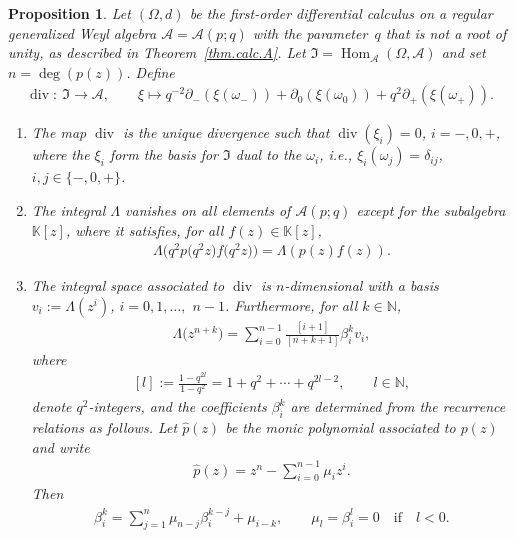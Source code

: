 \documentclass[pdftex]{sigma}
\numberwithin{equation}{section}
\newtheorem{Proposition}[Theorem]{Proposition}
{ \theoremstyle{definition}
\newtheorem{Definition}[Theorem]{Definition}
\newtheorem{Example}[Theorem]{Example}
\newtheorem{Remark}[Theorem]{Remark} }
\def\AWeyl#1#2{{\mathcal{A}}(#1;#2)}
\def\rhom#1#2#3{{\operatorname{Hom}_{#1}(#2,#3)}}
\begin{document}
\begin{Proposition}\label{prop.int}
Let $(\Omega, d)$ be the first-order differential calculus on a regular generalized Weyl algebra ${\mathcal{A}}= \AWeyl p q$ with the parameter~$q$ that is not a root of unity, as described in Theorem~{\rm \ref{thm.calc.A}}. Let ${\mathfrak I} = \rhom {\mathcal{A}} \Omega {\mathcal{A}}$ and set $n = \deg(p(z))$. Define
\begin{gather}\label{div.A}
\operatorname{div} \colon \ {\mathfrak I} \to {\mathcal{A}}, \qquad \xi \mapsto q^{-2}\partial_-(\xi(\omega_-)) + \partial_0(\xi(\omega_0)) + q^{2}\partial_+(\xi(\omega_+)).
\end{gather}
\begin{enumerate}\itemsep=0pt
\item[$(1)$] The map $\operatorname{div}$ is the unique divergence such that $\operatorname{div}(\xi_i)=0$, $i=-,0,+$, where the $\xi_i$ form the basis for ${\mathfrak I}$ dual to the $\omega_i$, i.e., $\xi_i(\omega_j) = \delta_{ij}$, $i,j\in \{-,0,+\}$.
\item[$(2)$]
The integral $\Lambda$ vanishes on all elements of $\AWeyl p q$ except for the subalgebra ${\mathbb K}[z]$, where it satisfies, for all $f(z) \in {\mathbb K}[z]$,
\begin{gather}\label{lambda.A}
\Lambda\big(q^2 p\big(q^2 z\big)f\big(q^2 z\big)\big) = \Lambda (p(z)f(z) ).
\end{gather}
\item[$(3)$] The integral space associated to $\operatorname{div}$ is $n$-dimensional with a basis $v_i := \Lambda(z^i)$, $i=0,1,\ldots,$ $n-1$. Furthermore, for all $k\in {\mathbb N}$,
\begin{gather}\label{lambda.compact}
\Lambda \big(z^{n+k}\big) = \sum_{i=0}^{n-1} \frac{[i+1]}{[n+k+1]}\beta^k_i v_i,
\end{gather}
where
\begin{gather}\label{q-int}
[l] := \frac{1-q^{2l}}{1-q^2} = 1+ q^2 +\cdots + q^{2l-2}, \qquad l\in {\mathbb N},
\end{gather}
denote $q^2$-integers, and the coefficients $\beta_i^k$ are determined from the recurrence relations as follows. Let $\hat{p}(z)$ be the monic polynomial associated to $p(z)$ and write
\begin{gather}\label{hatp}
\hat{p}(z) = z^n - \sum_{i=0}^{n-1} \mu_i z^i.
\end{gather}
Then
\begin{gather}\label{beta.rec}
\beta_i^k = \sum_{j=1}^n \mu_{n-j}\beta_i^{k-j} +\mu_{i-k}, \qquad \mu_l = \beta^l_i=0 \quad \mbox{if} \quad l<0.
\end{gather}
\end{enumerate}
\end{Proposition}
\end{document}
